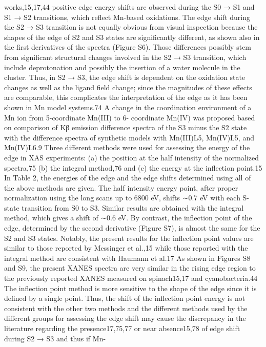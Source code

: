 \documentclass{article}
\begin{document}
works,15,17,44 positive edge energy shifts are observed during
the S0 → S1 and S1 → S2 transitions, which reflect Mn-based
oxidations.
The edge shift during the S2 → S3 transition is not equally
obvious from visual inspection because the shapes of the edge
of S2 and S3 states are significantly different, as shown also in
the first derivatives of the spectra (Figure S6). Those
differences possibly stem from significant structural changes
involved in the S2 → S3 transition, which include
deprotonation and possibly the insertion of a water molecule
in the cluster. Thus, in S2 → S3, the edge shift is dependent on
the oxidation state changes as well as the ligand field change;
since the magnitudes of these effects are comparable, this
complicates the interpretation of the edge as it has been shown
in Mn model systems.74 A change in the coordination
environment of a Mn ion from 5-coordinate Mn(III) to 6-
coordinate Mn(IV) was proposed based on comparison of Kβ
emission difference spectra of the S3 minus the S2 state with
the difference spectra of synthetic models with Mn(III)L5,
Mn(IV)L5, and Mn(IV)L6.9
Three different methods were used for assessing the energy
of the edge in XAS experiments: (a) the position at the half
intensity of the normalized spectra,75 (b) the integral
method,76 and (c) the energy at the inflection point.15 In
Table 2, the energies of the edge and the edge shifts
determined using all of the above methods are given. The
half intensity energy point, after proper normalization using the
long scans up to 6800 eV, shifts ∼0.7 eV with each S-state
transition from S0 to S3. Similar results are obtained with the
integral method, which gives a shift of ∼0.6 eV. By contrast,
the inflection point of the edge, determined by the second
derivative (Figure S7), is almost the same for the S2 and S3
states. Notably, the present results for the inflection point
values are similar to those reported by Messinger et al.,15 while
those reported with the integral method are consistent with
Haumann et al.17 As shown in Figures S8 and S9, the present
XANES spectra are very similar in the rising edge region to the
previously reported XANES measured on spinach15,17 and
cyanobacteria.44 The inflection point method is more sensitive
to the shape of the edge since it is defined by a single point.
Thus, the shift of the inflection point energy is not consistent
with the other two methods and the different methods used by
the different groups for assessing the edge shift may cause the
discrepancy in the literature regarding the presence17,75,77 or
near absence15,78 of edge shift during S2 → S3 and thus if Mn-
\end{document}
